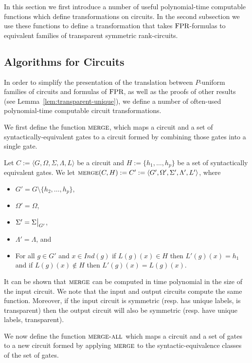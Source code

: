 \documentclass[../paper.tex]{subfiles}
\begin{document}
In this section we first introduce a number of useful polynomial-time computable
functions which define transformations on circuits. In the second subsection we
use these functions to define a transformation that takes $\text{\upshape FPR}$-formulas to
equivalent families of transparent symmetric rank-circuits.

\subsection{Algorithms for Circuits}
In order to simplify the presentation of the translation between $P$-uniform
families of circuits and formulas of $\text{\upshape FPR}$, as well as the proofs of other
results (see Lemma~\ref{lem:transparent-unique}), we define a number of
often-used polynomial-time computable circuit transformations.

We first define the function ${\normalfont\textsc{merge}}$, which maps a circuit and a set of
syntactically-equivalent gates to a circuit formed by combining those gates into
a single gate.

\begin{definition}
  Let $C := \langle G, \Omega, \Sigma , \Lambda, L \rangle$ be a circuit and $H
  := \{h_1, \ldots, h_p\}$ be a set of syntactically equivalent gates. We let
  ${\normalfont\textsc{merge}}(C, H) := C' := \langle G', \Omega', \Sigma', \Lambda', L'
  \rangle$, where
  \begin{itemize}
    \setlength\itemsep{0mm}
  \item $G' = G \setminus \{h_2, \ldots, h_p\}$,
  \item $\Omega' = \Omega$,
  \item $\Sigma' = \restr{\Sigma}{G'}$,
  \item $\Lambda' = \Lambda$, and
  \item For all $g \in G'$ and $x \in Ind(g)$ if $L(g) (x) \in H$ then $L'(g)(x)
    = h_1$ and if $L(g)(x) \notin H$ then $L'(g)(x) = L(g)(x)$.
  \end{itemize}
\end{definition}

It can be shown that ${\normalfont\textsc{merge}}$ can be computed in time polynomial in the size
of the input circuit. We note that the input and output circuits compute the
same function. Moreover, if the input circuit is symmetric (resp. has unique
labels, is transparent) then the output circuit will also be symmetric (resp.
have unique labels, transparent).

We now define the function ${\normalfont\textsc{merge-all}}$ which maps a circuit and a set of
gates to a new circuit formed by applying ${\normalfont\textsc{merge}}$ to the
syntactic-equivalence classes of the set of gates.
\end{document}
